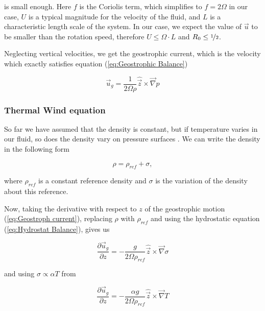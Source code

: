 \documentclass[12pt, a4paper]{article} %
\newcommand{\todoEnglish}{\todo[color=red!20]}
\begin{document}
		is small enough. Here $f$ is the Coriolis term, which simplifies to $f=2\Omega$ in our case, $U$ is a typical magnitude for the velocity of the fluid, and $L$ is a characteristic length scale of the system. In our case, we expect the value of $\vec{u}$ to be smaller than the rotation speed, therefore $U \leq \Omega \cdot L$ and $R_0 \leq \nicefrac{1}{2}$.
		
		Neglecting vertical velocities, we get the geostrophic current, which is the velocity which exactly satisfies equation (\ref{eq:Geostrophic Balance})
		
		\begin{equation}
			\vec{u}_g = \frac{1}{2\Omega \rho} \hat{\vec{z}} \times \vec{\nabla}p
			\label{eq:Geostroph current}
		\end{equation}
		
		\subsubsection{Thermal Wind equation}
			So far we have assumed that the density is constant, but if temperature varies in our fluid, so does the density vary on pressure surfaces \todoEnglish{this doesn't sound good..}. We can write the density in the following form
			
			\begin{equation}
				\rho = \rho_{ref} + \sigma ,
				\label{eq:Density}
			\end{equation} 
		
		where $\rho_{ref}$ is a constant reference density and $\sigma$ is the variation of the density about this reference. %
		
		Now, taking the derivative with respect to $z$ of the geostrophic motion (\ref{eq:Geostroph current}), replacing $\rho$ with $\rho_{ref}$ and using the hydrostatic equation (\ref{eq:Hydrostat Balance}), gives us
		
		\begin{equation}
			\frac{\partial \vec{u}_g}{\partial z} = - \frac{g}{2\Omega \rho_{ref}} \hat{\vec{z}} \times \vec{\nabla} \sigma
		\end{equation}
		
		and using $\sigma \propto \alpha T$ from %
		
		\begin{equation}
			\frac{\partial \vec{u}_g}{\partial z} = - \frac{\alpha g}{2\Omega \rho_{ref}} \hat{\vec{z}} \times \vec{\nabla} T
		\end{equation}
		
\end{document}
